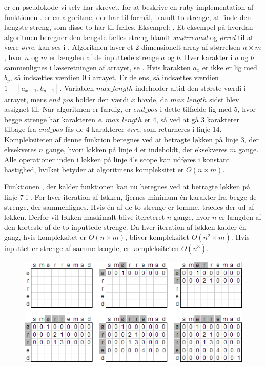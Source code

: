  er en pseudokode vi selv har skrevet, for at beskrive en ruby-implementation\cite{longestcommonsubstringrubywiki} af funktionen .  er en algoritme, der har til formål, blandt to strenge, at finde den længste streng, som disse to har til fælles. Eksempel: . Et eksempel på hvordan algoritmen beregner den længste fælles streng blandt \textit{smørremad} og \textit{ørred} til at være \textit{ørre}, kan ses i .
Algoritmen laver et 2-dimensionelt array af størrelsen $n \times m$, hvor $n$ og $m$ er længden af de inputtede strenge $a$ og $b$. Hver karakter i $a$ og $b$ sammenlignes i læseretningen af arrayet, se . Hvis karakten $a_x$ er ikke er lig med $b_y$, så indsættes værdien 0 i arrayet. Er de ens, så indsættes værdien $1 + [a_{x-1}, b_{y-1}]$.
Variablen $max\_length$ indeholder altid den største værdi i arrayet, mens $end\_pos$ holder den værdi $x$ havde, da $max\_length$ sidst blev assignet til.
Når algoritmen er færdig, er $end\_pos$ i dette tilfælde lig med 5, hvor begge strenge har karakteren \textit{e}. $max\_length$ er 4, så ved at gå 3 karakterer tilbage fra $end\_pos$ fås de 4 karakterer \textit{ørre}, som returneres i linje 14. Kompleksiteten af denne funktion beregnes ved at betragte løkken på linje 3, der eksekveres $n$ gange, hvori løkken på linje 4 er indeholdt, der eksekveres $m$ gange. Alle operationer inden i løkken på linje 4's scope kan udføres i konstant hastighed, hvilket betyder at algoritmens kompleksitet er $O(n \times m)$.

Funktionen , der kalder funktionen  kan nu beregnes ved at betragte løkken på linje 7 i . For hver iteration af løkken, fjernes minimum én karakter fra begge de strenge, der sammenlignes. Hvis én af de to strenge er tomme, trædes der ud af løkken. Derfor vil løkken maskimalt blive itereteret $n$ gange, hvor $n$ er længden af den korteste af de to inputtede strenge.
Da hver iteration af løkken kalder  én gang, hvis kompleksitet er $O(n \times m)$, bliver  kompleksitet $O(n^2 \times m)$. Hvis inputtet er strenge af samme længde, er kompleksiteten $O(n^3)$.
\begin{figure}
\centering
\includegraphics[scale=1]{billeder/longest-common-substring.png}
  \label{fig:longest-common-substring}
\end{figure}

